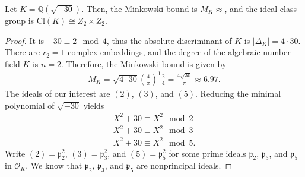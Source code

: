 \begin{exmbox}
    \begin{example}
        Let \(K = \mathbb{Q}(\sqrt{-30})\). Then, the Minkowski bound is \(M_K \approx \), and the ideal class group is \(\mathrm{Cl}(K) \cong Z_2 \times Z_2\).
    \end{example}
\end{exmbox}
\begin{proof}
    It is \(-30 \equiv 2 \mod{4}\), thus the absolute discriminant of \(K\) is \(|\Delta_K| = 4 \cdot 30\). There are \(r_2 = 1\) complex embeddings, and the degree of the algebraic number field \(K\) is \(n = 2\). Therefore, the Minkowski bound is given by
    \begin{align*}
        M_K = \sqrt{4 \cdot 30} \left(\frac{4}{\pi}\right)^1 \frac{2}{4} = \frac{4 \sqrt{30}}{\pi} \approx 6.97 \text{.}
    \end{align*}
    The ideals of our interest are \((2)\), \((3)\), and \((5)\). Reducing the minimal polynomial of \(\sqrt{-30}\) yields
    \begin{align*}
        X^2 + 30 \equiv X^2 \mod{2} \\
        X^2 + 30 \equiv X^2 \mod{3} \\
        X^2 + 30 \equiv X^2 \mod{5} \text{.}
    \end{align*}
    Write \((2) = \mathfrak{p}_2^2\), \((3) = \mathfrak{p}_3^2\), and \((5) = \mathfrak{p}_5^2\) for some prime ideals \(\mathfrak{p}_2\), \(\mathfrak{p}_3\), and \(\mathfrak{p}_5\) in \(\mathcal{O}_K\). We know that \(\mathfrak{p}_2\), \(\mathfrak{p}_3\), and \(\mathfrak{p}_5\) are nonprincipal ideals.
\end{proof}